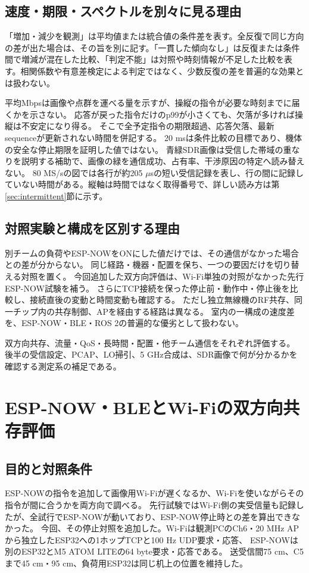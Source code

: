 \documentclass[a4paper,10pt]{ltjsarticle}
\begin{document}
\subsection{速度・期限・スペクトルを別々に見る理由}
「増加・減少を観測」は平均値または統合値の条件差を表す。全反復で同じ方向の差が出た場合は、その旨を別に記す。「一貫した傾向なし」は反復または条件間で増減が混在した比較、「判定不能」は対照や時刻情報が不足した比較を表す。相関係数や有意差検定による判定ではなく、少数反復の差を普遍的な効果とは扱わない。

平均Mbpsは画像や点群を運べる量を示すが、操縦の指令が必要な時刻までに届くかを示さない。
応答が戻った指令だけのp99が小さくても、欠落が多ければ操縦は不安定になり得る。
そこで全予定指令の期限超過、応答欠落、最新sequenceが更新されない時間を併記する。
20 msは条件比較の目標であり、機体の安全な停止期限を証明した値ではない。
青緑SDR画像は受信した帯域の重なりを説明する補助で、画像の緑を通信成功、占有率、干渉原因の特定へ読み替えない。
80 MS/sの図では各行が約205 $\mu$sの短い受信記録を表し、行の間に記録していない時間がある。縦軸は時間ではなく取得番号で、詳しい読み方は第\ref{sec:intermittent}節に示す。

\subsection{対照実験と構成を区別する理由}
別チームの負荷やESP-NOWをONにした値だけでは、その通信がなかった場合との差が分からない。
同じ経路・機器・配置を保ち、一つの要因だけを切り替える対照を置く。
今回追加した双方向評価は、Wi-Fi単独の対照がなかった先行ESP-NOW試験を補う。
さらにTCP接続を保った停止前・動作中・停止後を比較し、接続直後の変動と時間変動も確認する。
ただし独立無線機のRF共存、同一チップ内の共存制御、APを経由する経路は異なる。
室内の一構成の速度差を、ESP-NOW・BLE・ROS 2の普遍的な優劣として扱わない。

双方向共存、流量・QoS・長時間・配置・他チーム通信をそれぞれ評価する。
後半の受信設定、PCAP、LO掃引、5 GHz合成は、SDR画像で何が分かるかを確認する測定系の補足である。

\section{ESP-NOW・BLEとWi-Fiの双方向共存評価}\label{sec:mutual}
\subsection{目的と対照条件}
ESP-NOWの指令を追加して画像用Wi-Fiが遅くなるか、Wi-Fiを使いながらその指令が間に合うかを両方向で調べる。
先行試験ではWi-Fi側の実受信量も記録したが、全試行でESP-NOWが動いており、ESP-NOW停止時との差を算出できなかった。
今回、その停止対照を追加した。Wi-Fiは観測PCのCh6・20 MHz APから独立したESP32への1ホップTCPと100 Hz UDP要求・応答、
ESP-NOWは別のESP32とM5 ATOM LITEの64 byte要求・応答である。
送受信間75 cm、C5まで45 cm・95 cm、負荷用ESP32は同じ机上の位置を維持した。
\end{document}
